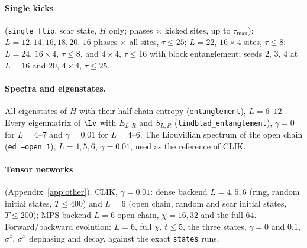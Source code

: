 \paragraph{Single kicks} (\texttt{single\_flip}, scar state, $H$ only; phases $\times$ kicked sites, up to $\tau_{\max}$): $L = 12, 14, 16, 18, 20$, $16$ phases $\times$ all sites, $\tau \le 25$; $L = 22$, $16 \times 4$ sites, $\tau \le 8$; $L = 24$, $16 \times 4$, $\tau \le 8$, and $4 \times 4$, $\tau \le 16$ with block entanglement; seeds $2$, $3$, $4$ at $L = 16$ and $20$, $4 \times 4$, $\tau \le 25$.

\paragraph{Spectra and eigenstates.} All eigenstates of $H$ with their half-chain entropy (\texttt{entanglement}), $L = 6$--$12$. Every eigenmatrix of $\Lv$ with $E_{L,R}$ and $S_{L,R}$ (\texttt{lindblad\_entanglement}), $\gamma = 0$ for $L = 4$--$7$ and $\gamma = 0.01$ for $L = 4$--$6$. The Liouvillian spectrum of the open chain (\texttt{ed --open 1}), $L = 4, 5, 6$, $\gamma = 0.01$, used as the reference of CLIK.

\paragraph{Tensor networks} (Appendix~\ref{app:other}). CLIK, $\gamma = 0.01$: dense backend $L = 4, 5, 6$ (ring, random initial states, $T \le 400$) and $L = 6$ (open chain, random and scar initial states, $T \le 200$); MPS backend $L = 6$ open chain, $\chi = 16, 32$ and the full $64$. Forward/backward evolution: $L = 6$, full $\chi$, $t \le 5$, the three states, $\gamma = 0$ and $0.1$, $\sigma^z$, $\sigma^x$ dephasing and decay, against the exact \texttt{states} runs.
